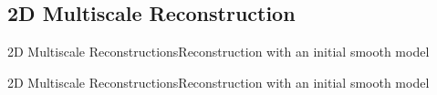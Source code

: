 
\subsection{2D Multiscale Reconstruction}
\begin{frame}{2D Multiscale Reconstructions}{Reconstruction with an initial smooth model}
  \vspace{-0.3cm}
  \renewcommand{\modelfile}{fig/marmousi_filter_0}
  \renewcommand{\modeltitle}{Initial $\velocity$ Model}
  \begin{figure}
        \hfill
  \end{figure}
  \vspace{-1.3cm}
  \renewcommand{\modeltitle}{Target $\velocity$ Model}
  \renewcommand{\modelfile}{fig/marmousi_target}
  \begin{figure}
        \hfill
   \end{figure}
\end{frame}

\begin{frame}[noframenumbering]{2D Multiscale Reconstructions}{Reconstruction with an initial smooth model}
  \vspace{-0.3cm}
  \renewcommand{\modelfile}{fig/marmousi_nofilter}
  \renewcommand{\modeltitle}{Reconstructed model $\velocity$ Model (30 iterations AB3)}
  \begin{figure}
        \hfill
  \end{figure}
  \vspace{-1.3cm}
  \renewcommand{\modeltitle}{Target $\velocity$ Model}
  \renewcommand{\modelfile}{fig/marmousi_target}
  \begin{figure}
        \hfill
   \end{figure}
\end{frame}






